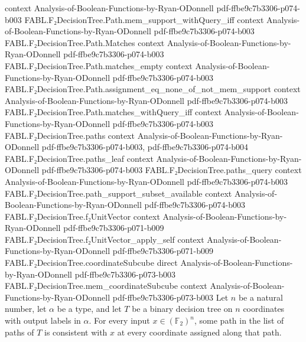 \begin{theorem}
  {context}
  {Analysis-of-Boolean-Functions-by-Ryan-ODonnell}
  {pdf-ffbe9c7b3306-p074-b003}
\proofstep
  {FABL.F₂DecisionTree.Path.mem_support_withQuery_iff}
  {context}
  {Analysis-of-Boolean-Functions-by-Ryan-ODonnell}
  {pdf-ffbe9c7b3306-p074-b003}
\proofstep
  {FABL.F₂DecisionTree.Path.Matches}
  {context}
  {Analysis-of-Boolean-Functions-by-Ryan-ODonnell}
  {pdf-ffbe9c7b3306-p074-b003}
\proofstep
  {FABL.F₂DecisionTree.Path.matches_empty}
  {context}
  {Analysis-of-Boolean-Functions-by-Ryan-ODonnell}
  {pdf-ffbe9c7b3306-p074-b003}
\proofstep
  {FABL.F₂DecisionTree.Path.assignment_eq_none_of_not_mem_support}
  {context}
  {Analysis-of-Boolean-Functions-by-Ryan-ODonnell}
  {pdf-ffbe9c7b3306-p074-b003}
\proofstep
  {FABL.F₂DecisionTree.Path.matches_withQuery_iff}
  {context}
  {Analysis-of-Boolean-Functions-by-Ryan-ODonnell}
  {pdf-ffbe9c7b3306-p074-b003}
\proofstep
  {FABL.F₂DecisionTree.paths}
  {context}
  {Analysis-of-Boolean-Functions-by-Ryan-ODonnell}
  {pdf-ffbe9c7b3306-p074-b003,
    pdf-ffbe9c7b3306-p074-b004}
\proofstep
  {FABL.F₂DecisionTree.paths_leaf}
  {context}
  {Analysis-of-Boolean-Functions-by-Ryan-ODonnell}
  {pdf-ffbe9c7b3306-p074-b003}
\proofstep
  {FABL.F₂DecisionTree.paths_query}
  {context}
  {Analysis-of-Boolean-Functions-by-Ryan-ODonnell}
  {pdf-ffbe9c7b3306-p074-b003}
\proofstep
  {FABL.F₂DecisionTree.path_support_subset_available}
  {context}
  {Analysis-of-Boolean-Functions-by-Ryan-ODonnell}
  {pdf-ffbe9c7b3306-p074-b003}
\proofstep
  {FABL.F₂DecisionTree.f₂UnitVector}
  {context}
  {Analysis-of-Boolean-Functions-by-Ryan-ODonnell}
  {pdf-ffbe9c7b3306-p071-b009}
\proofstep
  {FABL.F₂DecisionTree.f₂UnitVector_apply_self}
  {context}
  {Analysis-of-Boolean-Functions-by-Ryan-ODonnell}
  {pdf-ffbe9c7b3306-p071-b009}
\proofstep
  {FABL.F₂DecisionTree.coordinateSubcube}
  {direct}
  {Analysis-of-Boolean-Functions-by-Ryan-ODonnell}
  {pdf-ffbe9c7b3306-p073-b003}
\proofstep
  {FABL.F₂DecisionTree.mem_coordinateSubcube}
  {context}
  {Analysis-of-Boolean-Functions-by-Ryan-ODonnell}
  {pdf-ffbe9c7b3306-p073-b003}
Let $n$ be a natural number, let $\alpha$ be a type, and let $T$ be a binary decision
tree on $n$ coordinates with output labels in $\alpha$. For every input
$x\in(\mathbb{F}_2)^n$, some path in the list of paths of $T$ is consistent with $x$ at
every coordinate assigned along that path.
\end{theorem}

